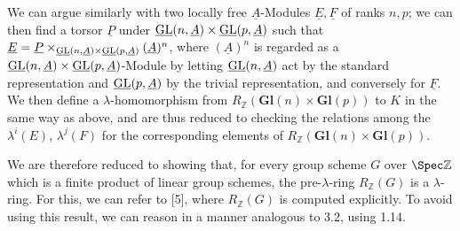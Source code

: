 We can argue similarly with two locally free \(\underline{A}\)-Modules \(\underline{E},\underline{F}\) of ranks \(n,p\); we can then find a torsor \(\underline{P}\) under \(\underline{\operatorname{GL}}(n,\underline{A})\times\underline{\operatorname{GL}}(p,\underline{A})\) such that \(\underline{E}=\underline{P}\times_{\underline{\operatorname{GL}}(n,\underline{A})\times\underline{\operatorname{GL}}(p,\underline{A})} (\underline{A})^n\), where \((\underline{A})^n\) is regarded as a \(\underline{\operatorname{GL}}(n,\underline{A})\times\underline{\operatorname{GL}}(p,\underline{A})\)-Module by letting \(\underline{\operatorname{GL}}(n,\underline{A})\) act by the standard representation and \(\underline{\operatorname{GL}}(p,\underline{A})\) by the trivial representation, and conversely for \(\underline{F}\). We then define a \(\lambda\)-homomorphism from \(R_{\mathbb Z}(\mathbf{Gl}(n)\times\mathbf{Gl}(p))\) to \(K\) in the same way as above, and are thus reduced to checking the relations among the \(\lambda^i(E)\), \(\lambda^j(F)\) for the corresponding elements of \(R_{\mathbb Z}(\mathbf{Gl}(n)\times\mathbf{Gl}(p))\).

We are therefore reduced to showing that, for every group scheme \(G\) over \(\Spec\mathbb Z\) which is a finite product of linear group schemes, the pre-\(\lambda\)-ring \(R_{\mathbb Z}(G)\) is a \(\lambda\)-ring. For this, we can refer to [5], where \(R_{\mathbb Z}(G)\) is computed explicitly. To avoid using this result, we can reason in a manner analogous to 3.2, using 1.14.

